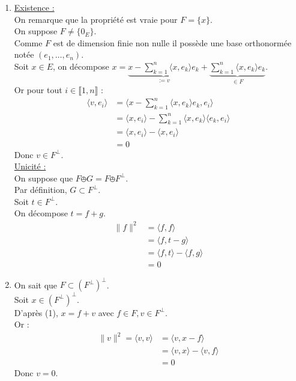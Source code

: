 \documentclass[../main.tex]{subfiles}
\begin{document}
\begin{enumerate}
    \item \underline{Existence :} \\
    On remarque que la propriété est vraie pour $F = \{x\}$. \\
    On suppose $F\neq\{0_E\}$. \\
    Comme $F$ est de dimension finie non nulle il possède une base orthonormée notée $(e_1, \ldots, e_n)$. \\
    Soit $x\in E$, on décompose $x = \underbrace{x - \sum_{k=1}^{n} \langle x, e_k\rangle e_k}_{:= v} + \underbrace{\sum_{k=1}^{n} \langle x, e_k\rangle e_k}_{\in F}$. \\
    Or pour tout $i\in \llbracket 1, n \rrbracket$ : 
    \begin{align*}
        \langle v, e_i\rangle &= \langle x - \sum_{k=1}^{n} \langle x, e_k\rangle e_k, e_i\rangle \\
        &= \langle x, e_i\rangle - \sum_{k=1}^{n} \langle x, e_k\rangle \langle e_k, e_i\rangle \\
        &= \langle x, e_i\rangle - \langle x, e_i\rangle \\
        &= 0 
    \end{align*}
    Donc $v\in F^\bot$. \\
    \underline{Unicité :} \\
    On suppose que $F\obot G = F\obot F^\bot$. \\
    Par définition, $G\subset F^\bot$. \\
    Soit $t\in F^\bot$. \\
    On décompose $t = f + g$. 
    \begin{align*}
        \|f\|^2 &= \langle f, f\rangle \\
        &= \langle f, t-g\rangle \\
        &= \langle f, t\rangle - \langle f, g\rangle \\
        &= 0
    \end{align*}
    \item On sait que $F\subset (F^\bot)^\bot$. \\
    Soit $x\in (F^\bot)^\bot$. \\
    D'après (1), $x = f + v$ avec $f\in F, v\in F^\bot$. \\
    Or : 
    \begin{align*}
        \|v\|^2 = \langle v, v\rangle &= \langle v, x-f\rangle \\
        &= \langle v, x\rangle - \langle v, f\rangle \\
        &= 0
    \end{align*}
    Donc $v = 0$. 
\end{enumerate}
\end{document}
